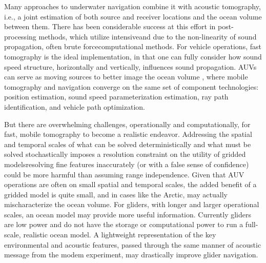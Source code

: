  Many approaches to underwater navigation combine it with acoustic tomography, i.e., a joint estimation of both source and receiver locations and the ocean volume between them.
There has been considerable success at this effort in post-processing methods, which utilize intensive\textemdash and due to the non-linearity of sound propagation, often brute force\textemdash computational methods. 
For vehicle operations, fast tomography is the ideal implementation, in that one can fully consider how sound speed structure, horizontally and vertically, influences sound propagation.
AUVs can serve as moving sources to better image the ocean volume \citep{deffenbaugh_optimal_1997,elisseeff_ocean_2002}, where mobile tomography and navigation converge on the same set of component technologies: position estimation, sound speed parameterization estimation, ray path identification, and vehicle path optimization.

But there are overwhelming challenges, operationally and computationally, for fast, mobile tomography to become a realistic endeavor.
Addressing the spatial and temporal scales of what can be solved deterministically and what must be solved stochastically imposes a resolution constraint on the utility of gridded models\textemdash resolving fine features inaccurately (or with a false sense of confidence) could be more harmful than assuming range independence.
Given that AUV operations are often on small spatial and temporal scales, the added benefit of a gridded model is quite small, and in cases like the Arctic, may actually mischaracterize the ocean volume. 
For gliders, with longer and larger operational scales, an ocean model may provide more useful information.
Currently gliders are low power and do not have the storage or computational power to run a full-scale, realistic ocean model.
A lightweight representation of the key environmental and acoustic features, passed through the same manner of acoustic message from the modem experiment, may drastically improve glider navigation.



